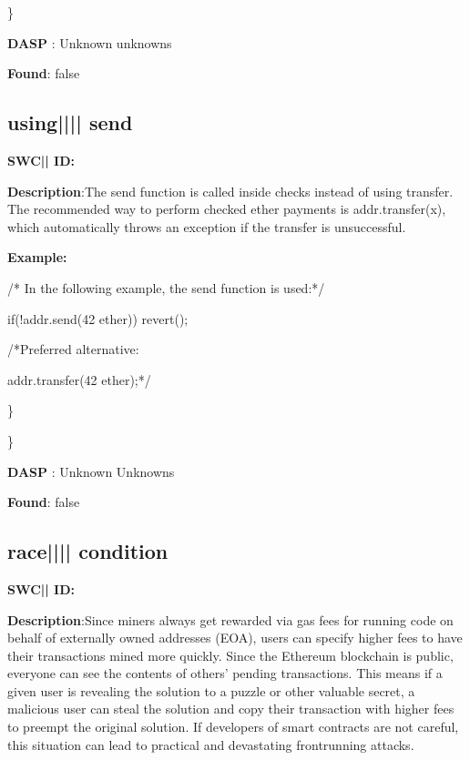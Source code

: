 \documentclass{article}
\begin{document}
\} 

\textbf{DASP} : Unknown unknowns

\textbf{Found}: false

\subsection{using{||\textunderscore|| }send} 
\textbf{SWC{|\textunderscore| }ID:} 

\textbf{Description}:The send function is called inside checks instead of using transfer. The recommended way to perform checked ether payments is addr.transfer(x), which automatically throws an exception if the transfer is unsuccessful.


\textbf{Example:} 
\begin{ffcode} 

/* In the following example, the send function is used:*/ 


if(!addr.send(42 ether)) {
    revert();
}

 /*Preferred alternative:

addr.transfer(42 ether);*/ 

\end{ffcode} 
\} 

\} 

\textbf{DASP} : Unknown Unknowns

\textbf{Found}: false

\subsection{race{||\textunderscore|| }condition} 
\textbf{SWC{|\textunderscore| }ID:} 

\textbf{Description}:Since miners always get rewarded via gas fees for running code on behalf of externally owned addresses (EOA), users can specify higher fees to have their transactions mined more quickly. Since the Ethereum blockchain is public, everyone can see the contents of others' pending transactions. This means if a given user is revealing the solution to a puzzle or other valuable secret, a malicious user can steal the solution and copy their transaction with higher fees to preempt the original solution. If developers of smart contracts are not careful, this situation can lead to practical and devastating front{\textendash}running attacks.
\end{document}
